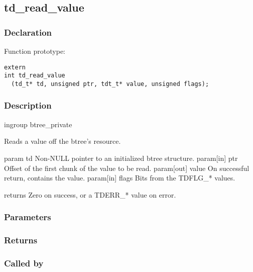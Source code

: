 
\newpage
\subsection{td\_read\_value}
\subsubsection{Declaration} Function prototype:

\begin{verbatim}
extern
int td_read_value
  (td_t* td, unsigned ptr, tdt_t* value, unsigned flags);
\end{verbatim}

\subsubsection{Description}


 ingroup btree\_private

 Reads a value off the btree's resource.

 param td Non-NULL pointer to an initialized btree structure.
 param[in] ptr Offset of the first chunk of the value to be read.
 param[out] value On successful return, contains the value.
 param[in] flags Bits from the TDFLG\_* values.

 returns Zero on success, or a TDERR\_* value on error.
 

\subsubsection{Parameters}
\subsubsection{Returns}
\subsubsection{Called by}
